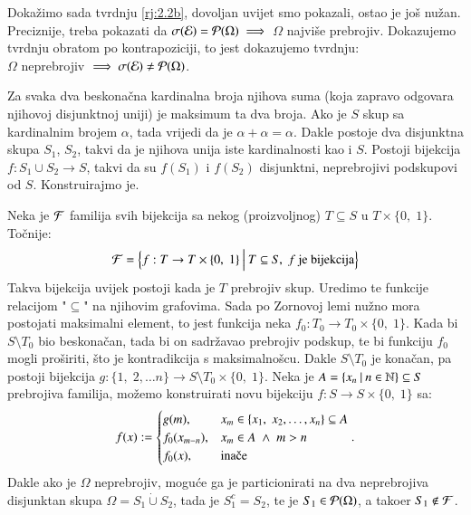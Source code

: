 \begin{rj}[\ref{zad:2.2}]
    Doka\v zimo sada tvrdnju \ref{rj:2.2b}, dovoljan uvijet smo pokazali, ostao je jo\v s nu\v zan.
    Preciznije, treba pokazati da $\sigma({\mathcal{E}}) = \mathcal{P}({\Omega}) \implies$ $\Omega$ najvi\v se prebrojiv.
    Dokazujemo tvrdnju obratom po kontrapoziciji, to jest dokazujemo tvrdnju:\\
    $\Omega$ neprebrojiv $\implies \sigma({\mathcal{E}}) \neq \mathcal{P}({\Omega})$.

    Za svaka dva beskona\v cna kardinalna broja njihova suma (koja zapravo odgovara njihovoj disjunktnoj uniji) je maksimum ta dva broja.
    Ako je $S$ skup sa kardinalnim brojem $\alpha$, tada vrijedi da je $\alpha + \alpha = \alpha$.
    Dakle postoje dva disjunktna skupa $S_1$, $S_2$, takvi da je njihova unija iste kardinalnosti kao i $S$.
    Postoji bijekcija $f: S_1 \cup S_2 \to S$, takvi da su $f(S_1)$ i $f(S_2)$ disjunktni, neprebrojivi podskupovi od $S$. Konstruirajmo je.

    Neka je $\mathcal{F}$ familija svih bijekcija sa nekog (proizvoljnog) $T \subseteq S$ u $T \times \{0, \; 1\}$.
    To\v cnije:
    \begin{equation*}
        \mathcal{F} = \Big\{ {f: T \to T \times \{0, \; 1\}} \: \Big| \: {T \subseteq S, \; f \textnormal{ je bijekcija}} \Big\}
    \end{equation*}
    Takva bijekcija uvijek postoji kada je $T$ prebrojiv skup.
    Uredimo te funkcije relacijom "$\subseteq$" na njihovim grafovima.
    Sada po Zornovoj lemi nu\v zno mora postojati maksimalni element, to jest funkcija neka $f_0: T_0 \to T_0 \times \{0, \; 1\}$.
    Kada bi $S \setminus T_0$ bio beskona\v can, tada bi on sadr\v zavao prebrojiv podskup, te bi funkciju $f_0$ mogli pro\v siriti, \v sto je kontradikcija s maksimalno\v scu.
    Dakle $S \setminus T_0$ je kona\v can, pa postoji bijekcija $g: \{1, \; 2, \ldots n\} \to S \setminus T_0 \times \{0, \; 1\}$.
    Neka je $A = \{{x_n} \: | \: {n \in \mathbb{N}}\} \subseteq S$ prebrojiva familija, mo\v zemo konstruirati novu bijekciju
    $f : S \to S \times \{0, \; 1\}$ sa:
    \begin{equation*}
        f(x) :=
        \begin{cases}
            g(m), & x_m \in \{ x_1, \; x_2, \ldots, x_n \} \subseteq A\\
            f_0(x_{m - n}), & x_m \in A \; \land \; m > n\\
            f_0(x),  & \textnormal{ina\v ce}
        \end{cases}.
    \end{equation*}
    Dakle ako je $\Omega$ neprebrojiv, mogu\' ce ga je particionirati na dva neprebrojiva disjunktan skupa $\Omega = S_1 \dot{\cup} S_2$, tada je $S_1^c = S_2$, te je $S_1 \in \mathcal{P}({\Omega})$, a tako\dj er $S_1 \notin \mathcal{F}$.
\end{rj}


